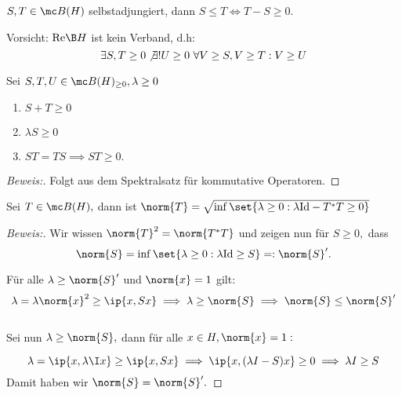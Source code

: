 
\begin{definition} $S, T \in \mc B(H)$ selbstadjungiert, dann $S \leq T \iff T - S \geq 0.$

\begin{rem} Vorsicht: $\text{Re} \B H$ ist kein Verband, d.h: \[\exists S, T \geq 0  \not \exists ! U \geq 0 \  \forall V \geq S, V \geq T: V \geq U\]
\end{rem}

\end{definition}


\begin{theorem} Sei $S, T, U \in \mc B(H)_{\geq 0}, \lambda \geq 0$

\begin{enumerate}
	
	\item $S + T \geq 0$
	
	\item $\lambda S \geq 0$
	
	\item $ST = TS \implies ST \geq 0.$
	
\end{enumerate}


\begin{proof}[Beweis:] Folgt aus dem Spektralsatz für kommutative Operatoren.
	
\end{proof}

\end{theorem}


\begin{theorem} Sei $T \in \mc B(H),$ dann ist $\norm{T} = \sqrt{\inf{\set{\lambda \geq 0: \lambda \text{Id} - T^*T \geq 0}}}$

\begin{proof}[Beweis:] Wir wissen $\norm{T}^2 = \norm{T^*T}$ und zeigen nun für $S \geq 0,$ dass \[\norm{S} = \inf \set{\lambda \geq 0: \lambda \text{Id}\geq S} =: \norm{S}'.\]
	
Für alle $\lambda \geq \norm{S}'$ und $\norm{x} = 1$ gilt: \[\lambda = \lambda \norm{x}^2 \geq \ip{x, Sx} \implies \lambda \geq \norm{S} \implies \norm{S} \leq \norm{S}'\] \\
	
Sei nun $\lambda \geq \norm{S},$ dann für alle $x \in H, \norm{x} = 1:$
	
\[\lambda = \ip{x,\lambda\I x} \geq \ip{x,Sx} \implies  \ip{x, (\lambda I -S)x} \geq 0 \implies \lambda I \geq S\] Damit haben wir $\norm{S} = \norm{S}'.$
	
\end{proof}
	
\end{theorem}



